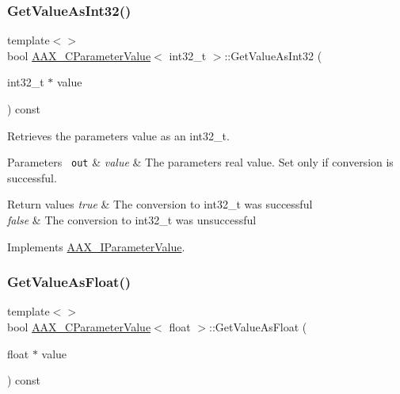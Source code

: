 \subsubsection{\texorpdfstring{GetValueAsInt32()}{GetValueAsInt32()}\hspace{0.1cm}{\footnotesize\ttfamily [2/2]}}
{\footnotesize\ttfamily template$<$$>$ \\
bool \mbox{\hyperlink{a01533}{A\+A\+X\+\_\+\+C\+Parameter\+Value}}$<$ int32\+\_\+t $>$\+::Get\+Value\+As\+Int32 (\begin{DoxyParamCaption}\item[{int32\+\_\+t $\ast$}]{value }\end{DoxyParamCaption}) const\hspace{0.3cm}{\ttfamily [virtual]}}



Retrieves the parameter\textquotesingle{}s value as an int32\+\_\+t. 


\begin{DoxyParams}[1]{Parameters}
\mbox{\texttt{ out}}  & {\em value} & The parameter\textquotesingle{}s real value. Set only if conversion is successful.\\
\hline
\end{DoxyParams}

\begin{DoxyRetVals}{Return values}
{\em true} & The conversion to int32\+\_\+t was successful \\
\hline
{\em false} & The conversion to int32\+\_\+t was unsuccessful \\
\hline
\end{DoxyRetVals}


Implements \mbox{\hyperlink{a01853_a94ff37ade5306ff8832a9848007c6397}{A\+A\+X\+\_\+\+I\+Parameter\+Value}}.

\mbox{\label{a01533_a8484adc259a40c25ac8414eac475eea3}} 
\subsubsection{\texorpdfstring{GetValueAsFloat()}{GetValueAsFloat()}\hspace{0.1cm}{\footnotesize\ttfamily [2/2]}}
{\footnotesize\ttfamily template$<$$>$ \\
bool \mbox{\hyperlink{a01533}{A\+A\+X\+\_\+\+C\+Parameter\+Value}}$<$ float $>$\+::Get\+Value\+As\+Float (\begin{DoxyParamCaption}\item[{float $\ast$}]{value }\end{DoxyParamCaption}) const\hspace{0.3cm}{\ttfamily [virtual]}}




